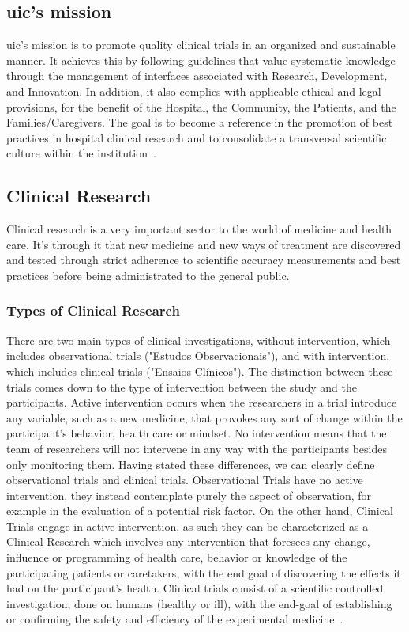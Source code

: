 \subsection{\acrshort{uic}'s mission}
\acrshort{uic}'s mission is to promote quality clinical trials in an organized and sustainable manner. It achieves this by following guidelines that value systematic knowledge through the management of interfaces associated with Research, Development, and Innovation. In addition, it also complies with applicable ethical and legal provisions, for the benefit of the Hospital, the Community, the Patients, and the Families/Caregivers.
The goal is to become a reference in the promotion of best practices in hospital clinical research and to consolidate a transversal scientific culture within the institution~\cite{hff-uic}.

\subsection{Clinical Research}
Clinical research is a very important sector to the world of medicine and
health care. It's through it that new medicine and new ways of
treatment are discovered and tested through strict adherence to 
scientific accuracy measurements and best practices before being
administrated to the general public. 

\subsubsection{Types of Clinical Research}
There are two main types of clinical investigations, without intervention, which includes observational trials ("Estudos Observacionais"), and with intervention, which includes clinical trials ("Ensaios Clínicos"). The distinction between these trials comes down to the type of intervention between the study and the participants. Active intervention occurs when the researchers in a trial introduce any variable, such as a new medicine, that provokes any sort of change within the participant's behavior, health care or mindset. No intervention means that the team of researchers will not intervene in any way with the participants besides only monitoring them.
Having stated these differences, we can clearly define observational trials and clinical trials.
Observational Trials have no active intervention, they instead contemplate purely the aspect of observation, for example in the evaluation of a potential risk factor. On the other hand, Clinical Trials engage in active intervention, as such they can be characterized as a Clinical Research which involves any intervention that foresees any change, influence or programming of health care, behavior or knowledge of the participating patients or caretakers, with the end goal of discovering the effects it had on the participant's health.
Clinical trials consist of a scientific controlled investigation, done
on humans (healthy or ill), with the end-goal of establishing or confirming the safety and efficiency of the experimental medicine~\cite{tipos-de-ensaios}.  

